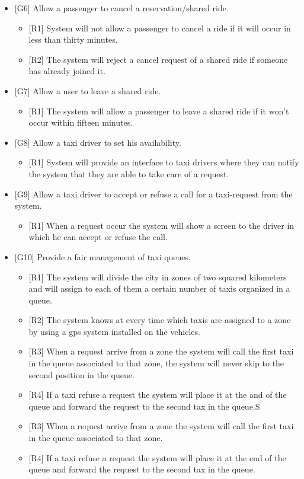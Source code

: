 \begin{itemize}
\begin{itemize}
			\end{itemize}
		\item {[G6]} Allow a passenger to cancel a reservation/shared ride.
			\begin{itemize}
				\item {[R1]} System will not allow a passenger to cancel a ride if it will occur in less than thirty minutes.
				\item {[R2]} The system will reject a cancel request of a shared ride if someone has already joined it.
			\end{itemize}
		\item {[G7]} Allow a user to leave a shared ride.
			\begin{itemize}
				\item {[R1]} The system will allow a passenger to leave a shared ride if it won't occur within fifteen minutes.
			\end{itemize}
		\item {[G8]} Allow a taxi driver to set his availability.
			\begin{itemize}
				\item {[R1]} System will provide an interface to taxi drivers where they can notify the system that they are able to take care of a request.
			\end{itemize}
		\item {[G9]} Allow a taxi driver to accept or refuse a call for a taxi-request from the system.
			\begin{itemize}
				\item {[R1]} When a request occur the system will show a screen to the driver in which he can accept or refuse the call.
			\end{itemize}
		\item {[G10]} Provide a fair management of taxi queues.
			\begin{itemize}
				\item {[R1]} The system will divide the city in zones of two squared kilometers and will assign to each of them a certain number of taxis organized in a queue.
				\item {[R2]} The system knows at every time which taxis are assigned to a zone by using a gps system installed on the vehicles.
				\item {[R3]} When a request arrive from a zone the system will call the first taxi in the queue associated to that zone, the system will never skip to the second position in the queue.
				\item {[R4]} If a taxi refuse a request the system will place it at the and of the queue and forward the request to the second tax in the queue.S
				\item {[R3]} When a request arrive from a zone the system will call the first taxi in the queue associated to that zone.
				\item {[R4]} If a taxi refuse a request the system will place it at the end of the queue and forward the request to the second tax in the queue.

			\end{itemize}
		\end{itemize}
\newpage
